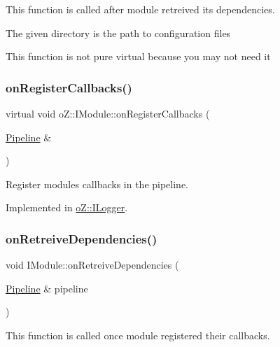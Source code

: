This function is called after module retreived its dependencies. 

The given directory is the path to configuration files

This function is not pure virtual because you may not need it \mbox{\label{classo_z_1_1_i_module_a3dc905faa6df5e22eecc6ffbc923fd95}} 
\subsubsection{\texorpdfstring{onRegisterCallbacks()}{onRegisterCallbacks()}}
{\footnotesize\ttfamily virtual void o\+Z\+::\+I\+Module\+::on\+Register\+Callbacks (\begin{DoxyParamCaption}\item[{\mbox{\hyperlink{classo_z_1_1_pipeline}{Pipeline}} \&}]{ }\end{DoxyParamCaption})\hspace{0.3cm}{\ttfamily [pure virtual]}}



Register module\textquotesingle{}s callbacks in the pipeline. 



Implemented in \mbox{\hyperlink{classo_z_1_1_i_logger_a10732b6da6e8f085c6fe5fa154d361ef}{o\+Z\+::\+I\+Logger}}.

\mbox{\label{classo_z_1_1_i_module_af183d3711ef7d7a6966ac078b63a7685}} 
\subsubsection{\texorpdfstring{onRetreiveDependencies()}{onRetreiveDependencies()}}
{\footnotesize\ttfamily void I\+Module\+::on\+Retreive\+Dependencies (\begin{DoxyParamCaption}\item[{\mbox{\hyperlink{classo_z_1_1_pipeline}{Pipeline}} \&}]{pipeline }\end{DoxyParamCaption})\hspace{0.3cm}{\ttfamily [virtual]}}



This function is called once module registered their callbacks. 

